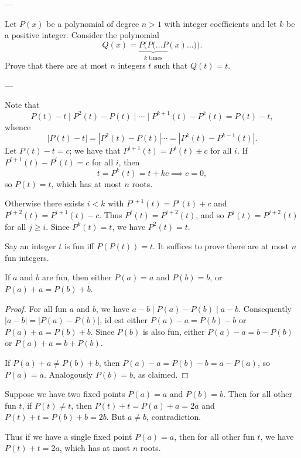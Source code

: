 
---

Let $P(x)$ be a polynomial of degree $n>1$ with integer coefficients and let $k$ be a positive integer. Consider the polynomial \[Q(x)=\underbrace{P(P(\ldots P}_{k\text{ times}}(x)\ldots)).\]
Prove that there are at most $n$ integers $t$ such that $Q(t)=t$.

---

Note that \[P(t)-t\mid P^2(t)-P(t)\mid\cdots\mid P^{k+1}(t)-P^k(t)=P(t)-t,\]
whence \[|P(t)-t|=|P^2(t)-P(t)|\cdots=|P^k(t)-P^{k-1}(t)|.\]
Let $P(t)-t=c$; we have that $P^{i+1}(t)=P^i(t)\pm c$ for all $i$. If $P^{i+1}(t)-P^i(t)=c$ for all $i$, then \[t=P^k(t)=t+kc\implies c=0,\]
so $P(t)=t$, which has at most $n$ roots.

Otherwise there exists $i<k$ with $P^{i+1}(t)=P^i(t)+c$ and $P^{i+2}(t)=P^{i+1}(t)-c$. Thus $P^i(t)=P^{i+2}(t)$, and so $P^j(t)=P^{j+2}(t)$ for all $j\ge i$. Since $P^k(t)=t$, we have $P^2(t)=t$.

Say an integer $t$ is fun iff $P(P(t))=t$. It suffices to prove there are at most $n$ fun integers.
\begin{iclaim*}
    If $a$ and $b$ are fun, then either $P(a)=a$ and $P(b)=b$, or $P(a)+a=P(b)+b$.
\end{iclaim*}
\begin{proof}
    For all fun $a$ and $b$, we have $a-b\mid P(a)-P(b)\mid a-b$. Consequently $|a-b|=|P(a)-P(b)|$, id est either $P(a)-a=P(b)-b$ or $P(a)+a=P(b)+b$. Since $P(b)$ is also fun, either $P(a)-a=b-P(b)$ or $P(a)+a=b+P(b)$.

    If $P(a)+a\ne P(b)+b$, then $P(a)-a=P(b)-b=a-P(a)$, so $P(a)=a$. Analogously $P(b)=b$, as claimed.
\end{proof}

Suppose we have two fixed points $P(a)=a$ and $P(b)=b$. Then for all other fun $t$, if $P(t)\ne t$, then $P(t)+t=P(a)+a=2a$ and $P(t)+t=P(b)+b=2b$. But $a\ne b$, contradiction.

Thus if we have a single fixed point $P(a)=a$, then for all other fun $t$, we have $P(t)+t=2a$, which has at most $n$ roots.


